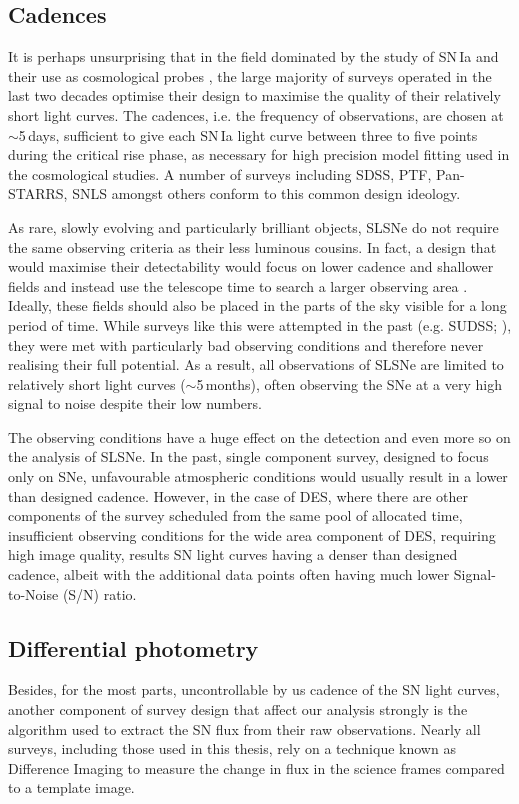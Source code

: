 \subsection{Cadences}
It is perhaps unsurprising that in the field dominated by the study of SN\,Ia and their use as cosmological probes \citep{Perlmutter1999,Riess1998}, the large majority of surveys operated in the last two decades optimise their design to maximise the quality of their relatively short light curves. The cadences, i.e. the frequency of observations, are chosen at $\sim$5\,days, sufficient to give each SN\,Ia light curve between three to five points during the critical rise phase, as necessary for high precision model fitting used in the cosmological studies. A number of surveys including SDSS, PTF, Pan-STARRS, SNLS amongst others conform to this common design ideology.

As rare, slowly evolving and particularly brilliant objects, SLSNe do not require the same observing criteria as their less luminous cousins. In fact, a design that would maximise their detectability would focus on lower cadence and shallower fields and instead use the telescope time to search a larger observing area \citep{Scovacricchi2016}. Ideally, these fields should also be placed in the parts of the sky visible for a long period of time. While surveys like this were attempted in the past (e.g. SUDSS; ), they were met with particularly bad observing conditions and therefore never realising their full potential. As a result, all observations of SLSNe are limited to relatively short light curves ($\sim$5\,months), often observing the SNe at a very high signal to noise despite their low numbers.

The observing conditions have a huge effect on the detection and even more so on the analysis of SLSNe. In the past, single component survey, designed to focus only on SNe, unfavourable atmospheric conditions would usually result in a lower than designed cadence. However, in the case of DES, where there are other components of the survey scheduled from the same pool of allocated time, insufficient observing conditions for the wide area component of DES, requiring high image quality, results SN light curves having a denser than designed cadence, albeit with the additional data points often having much lower Signal-to-Noise (S/N) ratio.

\subsection{Differential photometry}
Besides, for the most parts, uncontrollable by us cadence of the SN light curves, another component of survey design that affect our analysis strongly is the algorithm used to extract the SN flux from their raw observations. Nearly all surveys, including those used in this thesis, rely on a technique known as Difference Imaging \citep{Alard1997} to measure the change in flux in the science frames compared to a template image.

